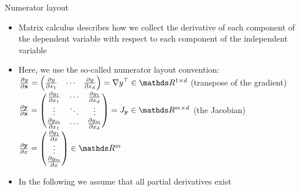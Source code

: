 \documentclass[11pt,compress,t,notes=noshow, xcolor=table]{beamer}
\begin{document}
\begin{vbframe}{Numerator layout}
\begin{itemize}
 
    \item Matrix calculus describes how we collect the derivative of each component of the dependent variable with respect to each component of the independent variable
    \item Here, we use the so-called numerator layout convention:
    $\frac{\partial y}{\partial \mathbf{x}} = \begin{pmatrix}\frac{\partial y}{\partial x_1} & \cdots & \frac{\partial y}{\partial x_d}\end{pmatrix} = \nabla y^\top \in \R^{1\times d}$ (transpose of the gradient)\\
    $\frac{\partial \mathbf{y}}{\partial \mathbf{x}} = \begin{pmatrix}\frac{\partial y_1}{\partial x_1} & \cdots & \frac{\partial y_1}{\partial x_d} \\
    \vdots & \ddots & \vdots \\ 
    \frac{\partial y_m}{\partial x_1} & \cdots & \frac{\partial y_m}{\partial x_d}
    \end{pmatrix} = J_\mathbf{y} \in \R^{m \times d}$ (the Jacobian)\\
    $\frac{\partial \mathbf{y}}{\partial x} = \begin{pmatrix}\frac{\partial y_1}{\partial x} \\
    \vdots\\ 
    \frac{\partial y_m}{\partial x}
    \end{pmatrix} \in \R^{m}$ 
    \item In the following we assume that all partial derivatives exist
\end{itemize}
\end{vbframe}
\end{document}
